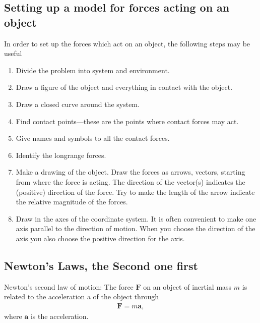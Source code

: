 \documentclass[letterpaper,10pt,english]{sphinxmanual}
\begin{document}
\subsection{Setting up a model for forces acting on an object}
\label{\detokenize{chapter2:setting-up-a-model-for-forces-acting-on-an-object}}
In order to set up the forces which act on an object, the following steps may be useful
\begin{enumerate}
%
\item {} 
Divide the problem into system and environment.

\item {} 
Draw a figure of the object and everything in contact with the object.

\item {} 
Draw a closed curve around the system.

\item {} 
Find contact points—these are the points where contact forces may act.

\item {} 
Give names and symbols to all the contact forces.

\item {} 
Identify the long\sphinxhyphen{}range forces.

\item {} 
Make a drawing of the object. Draw the forces as arrows, vectors, starting from where the force is acting. The direction of the vector(s) indicates the (positive) direction of the force. Try to make the length of the arrow indicate the relative magnitude of the forces.

\item {} 
Draw in the axes of the coordinate system. It is often convenient to make one axis parallel to the direction of motion. When you choose the direction of the axis you also choose the positive direction for the axis.

\end{enumerate}


\subsection{Newton’s Laws, the Second one first}
\label{\detokenize{chapter2:newton-s-laws-the-second-one-first}}
Newton’s second law of motion: The force \(\boldsymbol{F}\) on an object of inertial mass \(m\)
is related to the acceleration a of the object through
\begin{equation*}
\begin{split}
\boldsymbol{F} = m\boldsymbol{a},
\end{split}
\end{equation*}
where \(\boldsymbol{a}\) is the acceleration.
\end{document}
